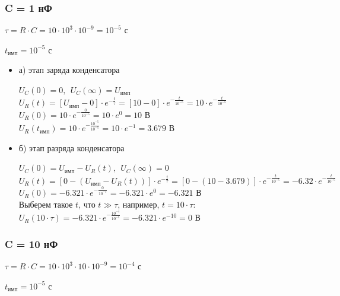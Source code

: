 \documentclass[a4paper,14pt]{extarticle}
\begin{document}
\subsubsection{C = 1 нФ}

$\tau = R \cdot C = 10 \cdot 10^3 \cdot 10^{-9} = 10^{-5} \text{ с}$
		
$t_\text{имп} = 10^{-5} \text{ с}$

\begin{itemize}
	\item[] а) этап заряда конденсатора

	$U_C(0)	= 0,\ \ U_C(\infty) = U_\text{имп}$\\
	$U_R(t) = [U_\text{имп} - 0] \cdot e^{-\frac{t}{\tau}} = [10 - 0] \cdot e^{-\frac{t}{10^{-5}}} = 10 \cdot e^{-\frac{t}{10^{-5}}}$\\
	$U_R(0) = 10 \cdot e^{-\frac{0}{10^{-5}}} = 10 \cdot e^0 = 10 \text{ В}$\\
	$U_R(t_\text{имп}) = 10 \cdot e^{-\frac{10^{-5}}{10^{-5}}} = 10 \cdot e^{-1} = 3.679 \text{ В}$

	\item[] б) этап разряда конденсатора

	$U_C(0)	= U_\text{имп} - U_R(t),\ \ U_C(\infty) = 0$\\
	$U_R(t) = [0 - (U_\text{имп} - U_R(t))] \cdot e^{-\frac{t}{\tau}} = [0 - (10 - 3.679)] \cdot e^{-\frac{t}{10^{-5}}} = -6.32 \cdot e^{-\frac{t}{10^{-5}}}$\\
	$U_R(0) = -6.321 \cdot e^{-\frac{0}{10^{-5}}} = -6.321 \cdot e^0 = -6.321 \text{ В}$\\
	Выберем такое $t$, что $t \gg \tau$, например, $t = 10 \cdot \tau$:\\
	$U_R(10 \cdot \tau)	= -6.321 \cdot e^{-\frac{10^{-4}}{10^{-5}}} = -6.321 \cdot e^{-10} = 0 \text{ В}$
\end{itemize}

\subsubsection{C = 10 нФ}

$\tau = R \cdot C = 10 \cdot 10^3 \cdot 10 \cdot 10^{-9} = 10^{-4} \text{ с}$

$t_\text{имп} = 10^{-5} \text{ с}$
\end{document}

